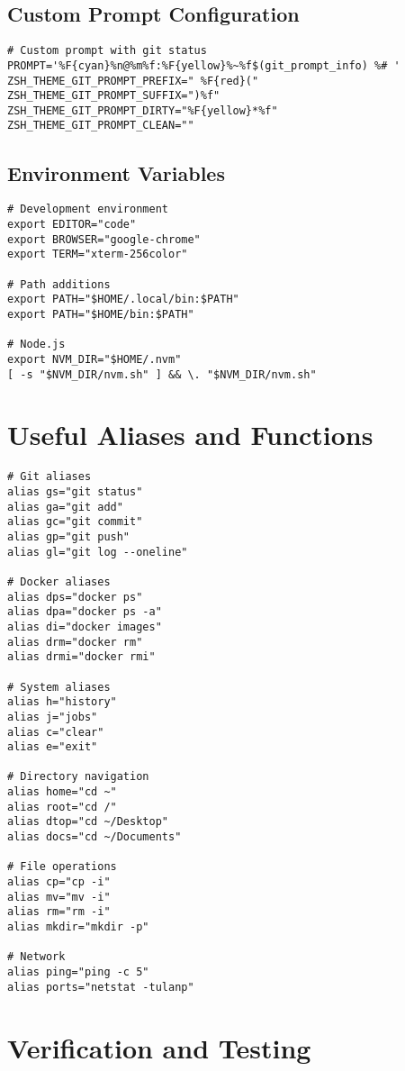 \documentclass{article}
\begin{document}
\subsection{Custom Prompt Configuration}

\begin{verbatim}
# Custom prompt with git status
PROMPT='%F{cyan}%n@%m%f:%F{yellow}%~%f$(git_prompt_info) %# '
ZSH_THEME_GIT_PROMPT_PREFIX=" %F{red}("
ZSH_THEME_GIT_PROMPT_SUFFIX=")%f"
ZSH_THEME_GIT_PROMPT_DIRTY="%F{yellow}*%f"
ZSH_THEME_GIT_PROMPT_CLEAN=""
\end{verbatim}

\subsection{Environment Variables}

\begin{verbatim}
# Development environment
export EDITOR="code"
export BROWSER="google-chrome"
export TERM="xterm-256color"

# Path additions
export PATH="$HOME/.local/bin:$PATH"
export PATH="$HOME/bin:$PATH"

# Node.js
export NVM_DIR="$HOME/.nvm"
[ -s "$NVM_DIR/nvm.sh" ] && \. "$NVM_DIR/nvm.sh"
\end{verbatim}

\section{Useful Aliases and Functions}

\begin{verbatim}
# Git aliases
alias gs="git status"
alias ga="git add"
alias gc="git commit"
alias gp="git push"
alias gl="git log --oneline"

# Docker aliases
alias dps="docker ps"
alias dpa="docker ps -a"
alias di="docker images"
alias drm="docker rm"
alias drmi="docker rmi"

# System aliases
alias h="history"
alias j="jobs"
alias c="clear"
alias e="exit"

# Directory navigation
alias home="cd ~"
alias root="cd /"
alias dtop="cd ~/Desktop"
alias docs="cd ~/Documents"

# File operations
alias cp="cp -i"
alias mv="mv -i"
alias rm="rm -i"
alias mkdir="mkdir -p"

# Network
alias ping="ping -c 5"
alias ports="netstat -tulanp"
\end{verbatim}

\section{Verification and Testing}
\end{document}
